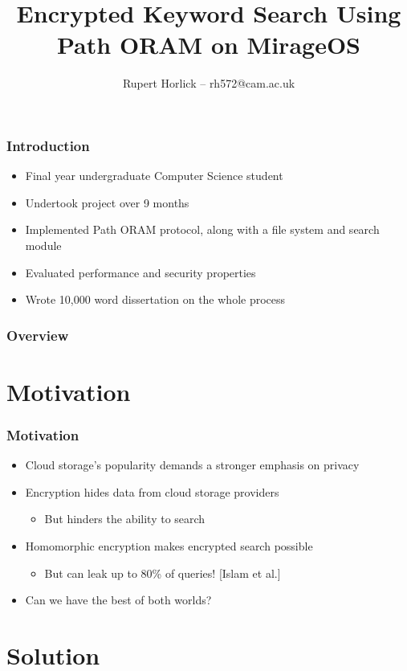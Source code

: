 \documentclass{beamer}
\title{Encrypted Keyword Search Using \\ Path ORAM on MirageOS}
\author{Rupert Horlick -- rh572@cam.ac.uk}
\begin{document}
\addtocounter{framenumber}{-1}
\frame[plain]{\titlepage}

\begin{frame}
    \frametitle{Introduction}
    \begin{itemize}
        \item Final year undergraduate Computer Science student
        \item Undertook project over 9 months
        \item Implemented Path ORAM protocol, along with a file system and search module
        \item Evaluated performance and security properties
        \item Wrote 10,000 word dissertation on the whole process
    \end{itemize}
\end{frame}

\begin{frame}
    \frametitle{Overview}
    \tableofcontents
\end{frame}

\section{Motivation}

\begin{frame}
    \frametitle{Motivation}
    \begin{itemize}
        \item Cloud storage's popularity demands a stronger emphasis on privacy
        \item Encryption hides data from cloud storage providers
            \begin{itemize}
                \item But hinders the ability to search
            \end{itemize}
        \item Homomorphic encryption makes encrypted search possible
            \begin{itemize}
                \item But can leak up to 80\% of queries! [Islam et al.]
            \end{itemize}
        \item Can we have the best of both worlds?
    \end{itemize}
\end{frame}

\section{Solution}
\end{document}

